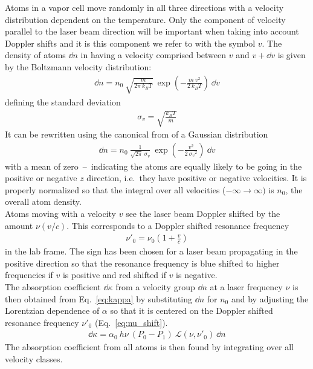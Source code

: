 Atoms in a vapor cell move randomly in all three directions with a velocity 
distribution dependent on the temperature. Only the component of velocity parallel 
to the laser beam direction will be important when taking into account Doppler 
shifts and it is this component we refer to with the symbol \(v \). The density 
of atoms \(\dd n \) in having a velocity comprised between \(v \) and \(v+\dd v \) 
is given by the Boltzmann velocity distribution:
\begin{align}
    \dd n = n_0 ~ \sqrt{ \frac{m}{2\pi~k_B T} }~
    \exp{ \left( -\frac{m~v^2}{2~k_B T} \right ) }~\dd v
\end{align}
defining the standard deviation
\begin{align}
    \sigma_v = \sqrt{\frac{k_B T}{m}}
\end{align}
It can be rewritten using the canonical from of a Gaussian distribution
\begin{align}
    \dd n = n_0~\frac{1}{\sqrt{2\pi}~\sigma_v}~
    \exp{ \left( -\frac{v^2}{2~{\sigma_v}^2} \right ) }~\dd v
\end{align}
with a mean of zero~--~indicating the atoms are equally likely to be going in the
positive or negative \(z \) direction, i.e.\ they have positive or negative 
velocities. It is properly normalized so that the integral over all velocities 
(\(-\infty \rightarrow \infty) \) is \(n_0 \), the overall atom density. \\
Atoms moving with a velocity \(v \) see the laser beam Doppler shifted by the 
amount \(\nu(v/c) \). This corresponds to a Doppler shifted resonance frequency
\begin{align}\label{eq:nu_shift}
    \nu'_0 = \nu_0 \left ( 1 + \frac{v}{c} \right)
\end{align}
in the lab frame. The sign has been chosen for a laser beam propagating in the 
positive direction so that the resonance frequency is blue shifted to higher 
frequencies if \(v \) is positive and red shifted if \(v \) is negative.\\
The absorption coefficient \(\dd\kappa \) from a velocity group \(\dd n \) at a 
laser frequency \(\nu \) is then obtained from Eq.~\ref{eq:kappa} by substituting 
\(\dd n \) for \(n_0 \) and by adjusting the Lorentzian dependence of \(\alpha \) 
so that it is centered on the Doppler shifted resonance frequency \(\nu'_0 \) 
(Eq.~\ref{eq:nu_shift}).
\begin{align}
    \dd\kappa = \alpha_0 ~ h\nu ~ (P_0-P_1) ~ \mathcal{L}(\nu,\nu'_0)~\dd n
\end{align}
The absorption coefficient from all atoms is then found by integrating over all 
velocity classes.

